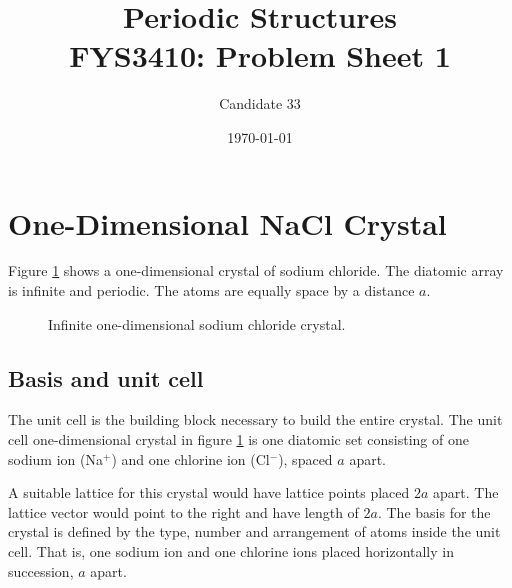 \documentclass[10pt, a4paper]{amsart}
\title[Periodic Structures]{Periodic Structures \\\hrulefill\small{ FYS3410: Problem Sheet 1 }\hrulefill}
\author{Candidate 33}
\date{\today}
\begin{document}
\maketitle

\section{One-Dimensional NaCl Crystal}

Figure \ref{fig:1DNaCl} shows a one-dimensional crystal of sodium chloride. The diatomic array is infinite and periodic. The atoms are equally space by a distance $a$.

\begin{figure}[ht]
	\centering
	\caption{Infinite one-dimensional sodium chloride crystal.}
	\label{fig:1DNaCl}
\end{figure}

\subsection{Basis and unit cell}

The unit cell is the building block necessary to build the entire crystal. The unit cell one-dimensional crystal in figure \ref{fig:1DNaCl} is one diatomic set consisting of one sodium ion (Na$^+$) and one chlorine ion (Cl$^-$), spaced $a$ apart.

\begin{figure}[H]
	\centering
\end{figure}

A suitable lattice for this crystal would have lattice points placed $2a$ apart. The lattice vector would point to the right and have length of $2a$. The basis for the crystal is defined by the type, number and arrangement of atoms inside the unit cell. That is, one sodium ion and one chlorine ions placed horizontally in succession, $a$ apart.
\end{document}
